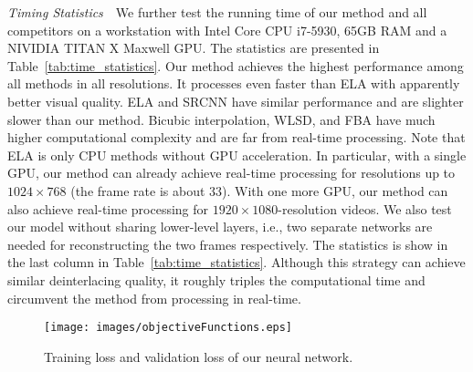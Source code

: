 \vspace{0.15in}
\noindent\emph{Timing Statistics}\,\,\,\,
We further test the running time of our method and all competitors on a workstation with Intel Core CPU i7-5930, 65GB RAM and a NIVIDIA TITAN X Maxwell GPU. The statistics are presented in Table~\ref{tab:time_statistics}. Our method achieves the highest performance among all methods in all resolutions. It processes even faster than ELA with apparently better visual quality. ELA and SRCNN have similar performance and are slighter slower than our method. Bicubic interpolation, WLSD, and FBA have much higher computational complexity and are far from real-time processing.  
Note that ELA is only CPU methods without GPU acceleration.
In particular, with a single GPU, our method can already achieve real-time processing for resolutions up to $1024\times 768$ (the frame rate is about $33$). With one more GPU, our method can also achieve real-time processing for $1920\times 1080$-resolution videos. We also test our model without sharing lower-level layers, i.e., two separate networks are needed for reconstructing the two frames respectively. The statistics is show in the last column in Table~\ref{tab:time_statistics}. Although this strategy can achieve similar deinterlacing quality, it roughly triples the computational time and circumvent the method from processing in real-time.
\begin{figure}[!tp]
	\centering
	\texttt{[image: images/objectiveFunctions.eps]}\\
	\caption{Training loss and validation loss of our neural network.}\label{fig:training_loss}
\end{figure}

